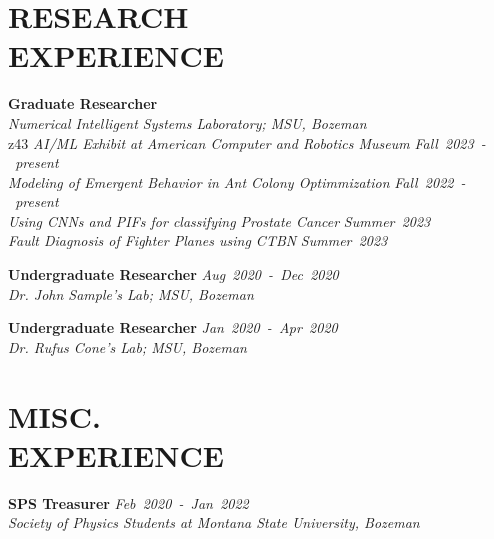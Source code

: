 \documentclass[margin]{res}
\begin{document}
\begin{resume}
\section{\uppercase{Research\\Experience}}
\noindent
\raggedright
\textbf{Graduate Researcher}\\
{\sl Numerical Intelligent Systems Laboratory; MSU, Bozeman}\\z43
\hspace{2ex} {\sl AI/ML Exhibit at American Computer and Robotics Museum} \hfill {\sl Fall~2023~-~present}\\
\hspace{2ex} {\sl Modeling of Emergent Behavior in Ant Colony Optimmization} \hfill {\sl Fall~2022~-~present}\\
\hspace{2ex} {\sl Using CNNs and PIFs for classifying Prostate Cancer} \hfill {\sl Summer~2023}\\
\hspace{2ex} {\sl Fault Diagnosis of Fighter Planes using CTBN} \hfill {\sl Summer~2023} \vspace*{1ex}\\
\noindent
\raggedright
\textbf{Undergraduate Researcher}\hfill 
{\sl Aug~2020~-~Dec~2020}\\
{\sl Dr. John Sample's Lab; MSU, Bozeman}\vspace*{1ex}\\
\noindent
\raggedright
\textbf{Undergraduate Researcher}\hfill
{\sl Jan~2020~-~Apr~2020}\\
{\sl Dr. Rufus Cone's Lab; MSU, Bozeman}


\section{\uppercase{Misc.\\Experience}}
\textbf{\textbf{SPS Treasurer}}\hfill
{\sl Feb~2020~-~Jan~2022}\\
{\sl Society of Physics Students at Montana State University, Bozeman}\vspace*{1ex}\\


\end{resume}
\end{document}
